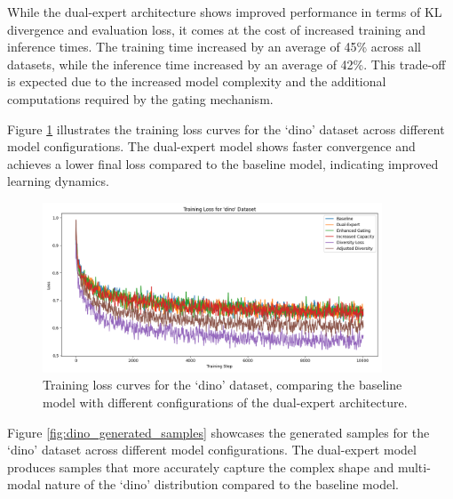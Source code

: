 \documentclass{article} %
\begin{document}
While the dual-expert architecture shows improved performance in terms of KL divergence and evaluation loss, it comes at the cost of increased training and inference times. The training time increased by an average of 45\% across all datasets, while the inference time increased by an average of 42\%. This trade-off is expected due to the increased model complexity and the additional computations required by the gating mechanism.

Figure \ref{fig:dino_train_loss} illustrates the training loss curves for the `dino' dataset across different model configurations. The dual-expert model shows faster convergence and achieves a lower final loss compared to the baseline model, indicating improved learning dynamics.

\begin{figure}[t]
    \centering
    \includegraphics[width=0.9\textwidth]{dino_train_loss.png}
    \caption{Training loss curves for the `dino' dataset, comparing the baseline model with different configurations of the dual-expert architecture.}
    \label{fig:dino_train_loss}
\end{figure}

Figure \ref{fig:dino_generated_samples} showcases the generated samples for the `dino' dataset across different model configurations. The dual-expert model produces samples that more accurately capture the complex shape and multi-modal nature of the `dino' distribution compared to the baseline model.
\end{document}
